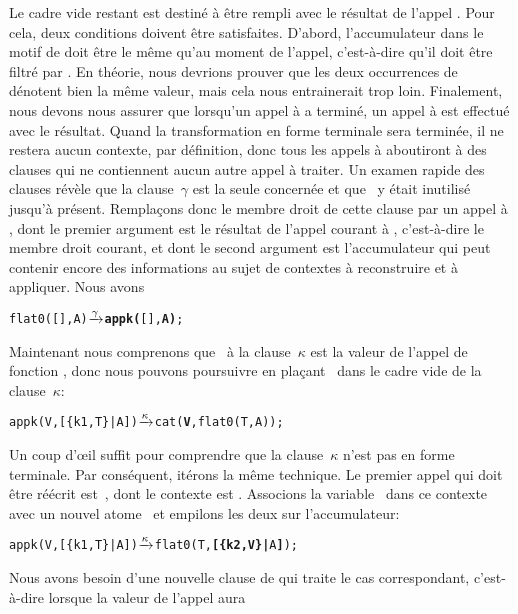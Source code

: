 Le cadre vide restant est destiné à être rempli avec le résultat de
l'appel . Pour cela, deux conditions
doivent être satisfaites. D'abord, l'accumulateur dans le motif de
 doit être le même qu'au moment de l'appel,
c'est-à-dire qu'il doit être filtré par \erlcode{[\{k1,T\}|A]}. En
théorie, nous devrions prouver que les deux occurrences de~
dénotent bien la même valeur, mais cela nous entrainerait trop
loin. Finalement, nous devons nous assurer que lorsqu'un appel à
 a terminé, un appel à  est effectué
avec le résultat. Quand la transformation en forme terminale sera
terminée, il ne restera aucun contexte, par définition, donc tous les
appels à  aboutiront à des clauses qui ne contiennent
aucun autre appel à traiter. Un examen rapide des clauses révèle que
la clause~\(\gamma\) est la seule concernée et que ~y était
inutilisé jusqu'à présent. Remplaçons donc le membre droit de cette
clause par un appel à , dont le premier argument est
le résultat de l'appel courant à , c'est-à-dire le
membre droit courant, et dont le second argument est l'accumulateur
qui peut contenir encore des informations au sujet de contextes à
reconstruire et à appliquer. Nous avons
\begin{alltt}
flat0(       [],A) \(\smashedrightarrow{\gamma}\) \textbf{appk(}[],\textbf{A)};
\end{alltt}
Maintenant nous comprenons que~ à la clause~\(\kappa\) est
la valeur de l'appel de fonction , donc
nous pouvons poursuivre en plaçant~ dans le cadre vide de la clause~\(\kappa\):
\begin{alltt}
appk(V,[\{k1,T\}|A]) \(\smashedrightarrow{\kappa}\) cat(\textbf{V},flat0(T,A));
\end{alltt}
Un coup d'{\oe}il suffit pour comprendre que la clause~\(\kappa\)
n'est pas en forme terminale. Par conséquent, itérons la même
technique. Le premier appel qui doit être réécrit
est~, dont le contexte est
. Associons la variable~
dans ce contexte avec un nouvel atome~ et empilons les
deux sur l'accumulateur:
\begin{alltt}
appk(V,[\{k1,T\}|A]) \(\smashedrightarrow{\kappa}\) flat0(T,\textbf{[\{k2,V\}|}A\textbf{]});
\end{alltt}
Nous avons besoin d'une nouvelle clause de  qui traite
le cas correspondant, c'est-à-dire lorsque la valeur de l'appel aura
